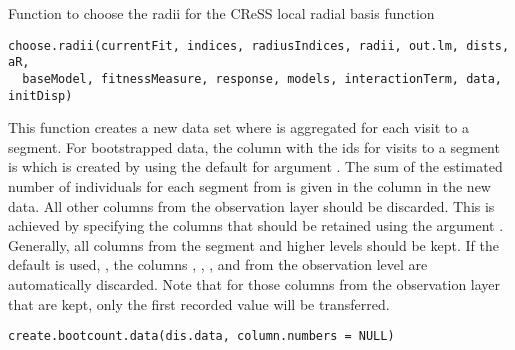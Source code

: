 \documentclass[a4paper]{book}
\begin{document}
%
\begin{Examples}
\end{Examples}
%
\begin{Description}\relax
Function to choose the radii for the CReSS local radial basis function
\end{Description}
%
\begin{Usage}
\begin{verbatim}
choose.radii(currentFit, indices, radiusIndices, radii, out.lm, dists, aR,
  baseModel, fitnessMeasure, response, models, interactionTerm, data, initDisp)
\end{verbatim}
\end{Usage}
%
\begin{Description}\relax
This function creates a new data set where  is aggregated 
for each visit to a segment. For bootstrapped data, the column with the ids 
for visits to a segment is  which is created
by  using the default for argument . 
The sum of the estimated number of individuals for each segment from 
 is given in the column  in the new data. 
All other columns from the observation layer should be discarded. This is achieved 
by specifying the columns that should be retained using the argument . 
Generally, all columns from the segment and higher levels should be kept. 
If the default is used, , the columns , , 
,  and  from the observation level are automatically 
discarded. Note that for those columns from the observation layer that are kept, only the 
first recorded value will be transferred.
\end{Description}
%
\begin{Usage}
\begin{verbatim}
create.bootcount.data(dis.data, column.numbers = NULL)
\end{verbatim}
\end{Usage}
\end{document}
